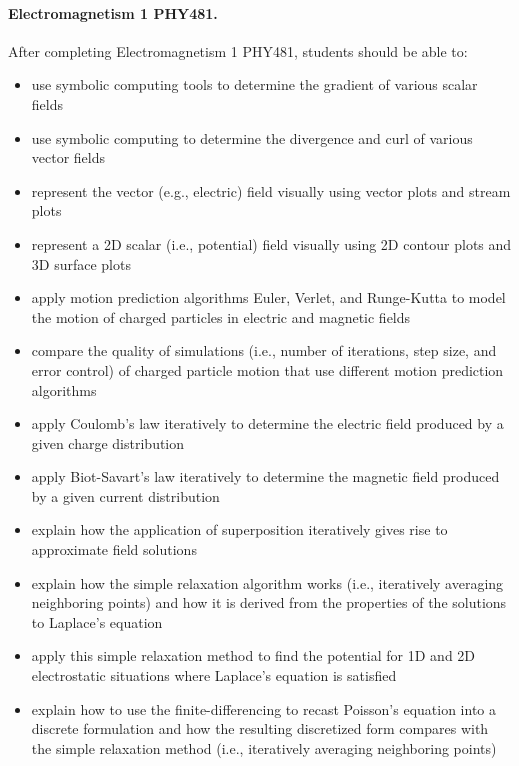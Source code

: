 \documentclass[%
oneside,                 %
final,                   %
10pt]{article}
\begin{document}
\paragraph{Electromagnetism 1 PHY481.}
After completing Electromagnetism 1 PHY481, students should be able to:
\begin{itemize}
  \item use symbolic computing tools to determine the gradient of various scalar fields

  \item use symbolic computing to determine the divergence and curl of various vector fields

  \item represent the vector (e.g., electric) field visually using vector plots and stream plots

  \item represent a 2D scalar (i.e., potential) field visually using 2D contour plots and 3D surface plots

  \item apply motion prediction algorithms Euler, Verlet, and Runge-Kutta to model the motion of charged particles in electric and magnetic fields

  \item compare the quality of simulations (i.e., number of iterations, step size, and error control) of charged particle motion that use different motion prediction algorithms

  \item apply Coulomb's law iteratively to determine the electric field produced by a given charge distribution

  \item apply Biot-Savart's law iteratively to determine the magnetic field produced by a given current distribution

  \item explain how the application of superposition iteratively gives rise to approximate field solutions

  \item explain how the simple relaxation algorithm works (i.e., iteratively averaging neighboring points) and how it is derived from the properties of the solutions to Laplace's equation

  \item apply this simple relaxation method to find the potential for 1D and 2D electrostatic situations where Laplace's equation is satisfied

  \item explain how to use the finite-differencing to recast Poisson's equation into a discrete formulation and how the resulting discretized form compares with the simple relaxation method (i.e., iteratively averaging neighboring points)


\end{itemize}
\end{document}
